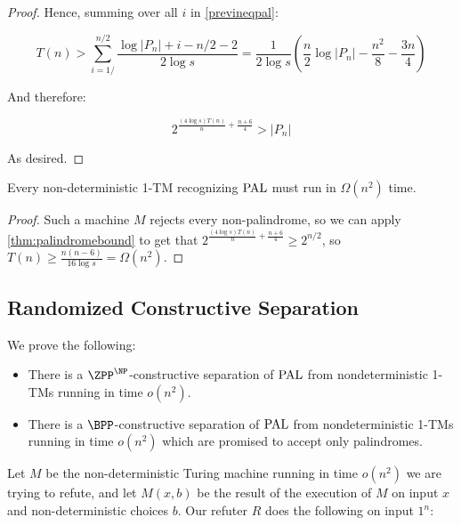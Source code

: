 \begin{proof}
Hence, summing over all $i$ in \eqref{previneqpal}:

$$
T(n) > \sum_{i=1/}^{n/2} \frac{\log |P_n| + i - n/2 - 2}{2 \log s} = \frac{1}{2\log s} \left( \frac{n}{2} \log |P_n| - \frac{n^2}{8} -\frac{3n}{4} \right) 
$$



And therefore:

$$
2^{\frac{(4 \log s) T(n)}{n} + \frac{n+6}{4}} > |P_n|
$$

As desired. 

    
\end{proof}

\begin{corollary}
\label{cor:palindromebound}
Every non-deterministic 1-TM recognizing $\mathrm{PAL}$ must run in $\Omega(n^2)$ time.
\end{corollary}
\begin{proof}
Such a machine $M$ rejects every non-palindrome, so we can apply \cref{thm:palindromebound} to get that
$2^{\frac{(4 \log s) T(n)}{n} + \frac{n+6}{4}} \geq 2^{n/2}$, so $T(n) \geq \frac{n(n-6)}{16 \log s} = \Omega(n^2)$.
\end{proof}



\subsection{Randomized Constructive Separation}

We prove the following: 

\begin{theorem}
    \begin{itemize}
    \item There is a $\ZPP^\NP$-constructive separation of $\mathrm{PAL}$ from nondeterministic 1-TMs 
    running in time $o(n^2)$. 
    \item There is a $\BPP$-constructive separation of $\mathrm{PAL}$ from nondeterministic 1-TMs 
    running in time $o(n^2)$ which
    are promised to accept only palindromes. 
    \end{itemize}
\end{theorem}

Let $M$ be the non-deterministic Turing machine running in time $o(n^2)$ we are trying to refute, 
and let $M(x, b)$ be the result of the execution of $M$ on input $x$ and non-deterministic choices $b$.
Our refuter $R$ does the following on input $1^n$:

